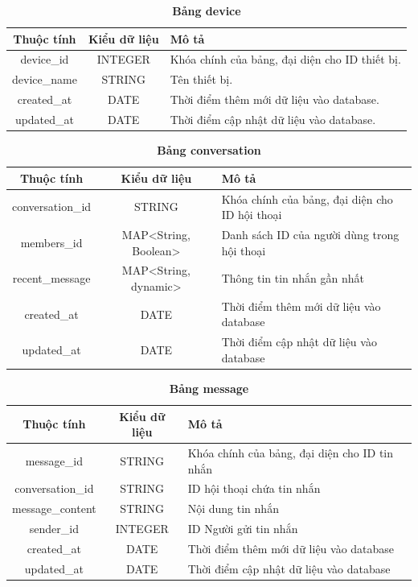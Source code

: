 \begin{table}[H]
  \caption{\bfseries \fontsize{12pt}{0pt}\selectfont Bảng device}
  \centering
  \begin{tabularx}{0.9\textwidth}{|c|c|X|}
    \hline
    \textbf{Thuộc tính} & \textbf{Kiểu dữ liệu} & \textbf{Mô tả} \\
    \hline
    device\_id & INTEGER & Khóa chính của bảng, đại diện cho ID thiết bị. \\
    \hline
    device\_name & STRING & Tên thiết bị. \\
    \hline
    created\_at & DATE & Thời điểm thêm mới dữ liệu vào database. \\
    \hline
    updated\_at & DATE & Thời điểm cập nhật dữ liệu vào database. \\
    \hline
  \end{tabularx}
\end{table}

\begin{table}[H]
  \caption{\bfseries \fontsize{12pt}{0pt}\selectfont Bảng conversation}
  \centering
  \begin{tabularx}{0.9\textwidth}{|c|c|X|}
    \hline
    \textbf{Thuộc tính} & \textbf{Kiểu dữ liệu} & \textbf{Mô tả} \\
    \hline
    conversation\_id & STRING & Khóa chính của bảng, đại diện cho ID hội thoại \\
    \hline
    members\_id & MAP<String, Boolean> & Danh sách ID của người dùng trong hội thoại \\
    \hline
    recent\_message & MAP<String, dynamic> & Thông tin tin nhắn gần nhất \\
    \hline
    created\_at & DATE & Thời điểm thêm mới dữ liệu vào database \\
    \hline
    updated\_at & DATE & Thời điểm cập nhật dữ liệu vào database \\
    \hline
  \end{tabularx}
\end{table}

\begin{table}[H]
  \caption{\bfseries \fontsize{12pt}{0pt}\selectfont Bảng message}
  \centering
  \begin{tabularx}{0.9\textwidth}{|c|c|X|}
    \hline
    \textbf{Thuộc tính} & \textbf{Kiểu dữ liệu} & \textbf{Mô tả} \\
    \hline
    message\_id & STRING & Khóa chính của bảng, đại diện cho ID tin nhắn \\
    \hline
    conversation\_id & STRING & ID hội thoại chứa tin nhắn \\
    \hline
    message\_content & STRING & Nội dung tin nhắn \\
    \hline
    sender\_id & INTEGER & ID Người gửi tin nhắn\\
    \hline
    created\_at & DATE & Thời điểm thêm mới dữ liệu vào database \\
    \hline
    updated\_at & DATE & Thời điểm cập nhật dữ liệu vào database \\
    \hline
  \end{tabularx}
\end{table}

